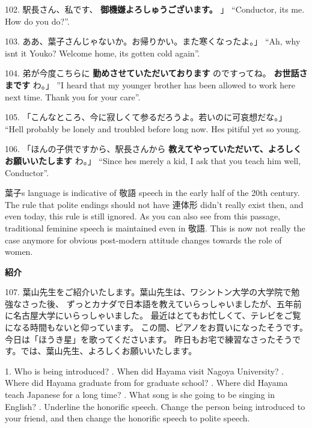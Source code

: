\par{102. 駅長さん、私です、 \textbf{御機嫌よろしゅうございます。 }」 \hfill\break
“Conductor, it\textquotesingle s me. How do you do?”. }
 
\par{103. ああ、葉子さんじゃないか。お帰りかい。また寒くなったよ。」 \hfill\break
“Ah, why isn\textquotesingle t it Youko? Welcome home, it\textquotesingle s gotten cold again”. }
 
\par{104. 弟が今度こちらに \textbf{勤めさせていただいております }のですってね。 \textbf{お世話さまです }わ。」 \hfill\break
”I heard that my younger brother has been allowed to work here next time. Thank you for your care”. }
 
\par{105. 「こんなところ、今に寂しくて参るだろうよ。若いのに可哀想だな。」 \hfill\break
“He\textquotesingle ll probably be lonely and troubled before long now. He\textquotesingle s pitiful yet so young. }
 
\par{106. 「ほんの子供ですから、駅長さんから \textbf{教えてやっていただいて、よろしくお願いいたします }わ。」 \hfill\break
“Since he\textquotesingle s merely a kid, I ask that you teach him well, Conductor”. }

\par{ 葉子\textquotesingle s language is indicative of 敬語 speech in the early half of the 20th century. The rule that polite endings should not have 連体形 didn't really exist then, and even today, this rule is still ignored. As you can also see from this passage, traditional feminine speech is maintained even in 敬語. This is now not really the case anymore for obvious post-modern attitude changes towards the role of women. }

\begin{center}
 \textbf{紹介 }
\end{center}

\par{107.  葉山先生をご紹介いたします。葉山先生は、ワシントン大学の大学院で勉強なさった後、 \hfill\break
 ずっとカナダで日本語を教えていらっしゃいましたが、五年前に名古屋大学にいらっしゃいました。 \hfill\break
 最近はとてもお忙しくて、テレビをご覧になる時間もないと仰っています。 \hfill\break
 この間、ピアノをお買いになったそうです。今日は「ほうき星」を歌ってくださいます。 \hfill\break
 昨日もお宅で練習なさったそうです。では、葉山先生、よろしくお願いいたします。 }

\par{1. Who is being introduced? \hfill{}. When did Hayama visit Nagoya University? \hfill{}. Where did Hayama graduate from for graduate school? \hfill{}. Where did Hayama teach Japanese for a long time? \hfill{}. What song is she going to be singing in English? \hfill{}. Underline the honorific speech. Change the person being introduced to your friend, and then change the honorific speech to polite speech. }


